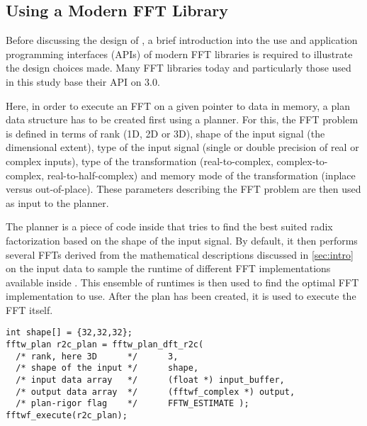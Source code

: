 \subsection{Using a Modern FFT Library}
\label{ssec:modern_ffts}
Before discussing the design of \gearshifft{}, a brief introduction into the use and application programming interfaces (APIs) of modern FFT libraries is required to illustrate the design choices made. Many FFT libraries today and particularly those used in this study base their API on \fftw{} $3.0$. 

Here, in order to execute an FFT on a given pointer to data in memory, a plan data structure has to be created first using a planner. For this, the FFT problem is defined in terms of rank (1D, 2D or 3D), shape of the input signal (the dimensional extent), type of the input signal (single or double precision of real or complex inputs), type of the transformation (real-to-complex, complex-to-complex, real-to-half-complex) and memory mode of the transformation (inplace versus out-of-place). These parameters describing the FFT problem are then used as input to the planner. 

The planner is a piece of code inside \fftw{} that tries to find the best suited radix factorization based on the shape of the input signal. By default, it then performs several FFTs derived from the mathematical descriptions discussed in \cref{sec:intro} on the input data to sample the runtime of different FFT implementations available inside \fftw{}. This ensemble of runtimes is then used to find the optimal FFT implementation to use. After the plan has been created, it is used to execute the FFT itself.

\begin{lstlisting}[caption={Minimal usage example of the \fftw{} single precision real-to-complex planner API. Memory management is omitted.},label={lst:fftw_example}]
int shape[] = {32,32,32};
fftw_plan r2c_plan = fftw_plan_dft_r2c(
  /* rank, here 3D      */		3,                       
  /* shape of the input */		shape,                   
  /* input data array   */		(float *) input_buffer,  
  /* output data array  */		(fftwf_complex *) output,
  /* plan-rigor flag    */		FFTW_ESTIMATE );         
fftwf_execute(r2c_plan);
\end{lstlisting}

